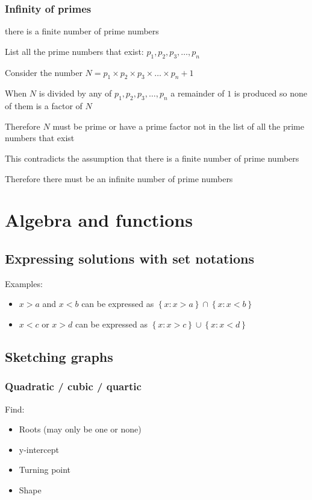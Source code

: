 \documentclass[A4paper]{article}
\begin{document}
	\subsubsection{Infinity of primes}
	\begin{description}
		\item [ Assumption:] there is a finite number of prime numbers
		\item List all the prime numbers that exist: $p_1, p_2, p_3, \dots, p_n$
		\item Consider the number $N = p_1 \times p_2 \times p_3 \times \dots \times p_n + 1$
		\item When $N$ is divided by any of $p_1, p_2, p_3, \dots, p_n$ a remainder of $1$ is produced so none of them is a factor of $N$
		\item Therefore $N$ must be prime or have a prime factor not in the list of all the prime numbers that exist
		\item This contradicts the assumption that there is a finite number of prime numbers
		\item Therefore there must be an infinite number of prime numbers
	\end{description}


	\pagebreak

	\section{Algebra and functions}
	\subsection{Expressing solutions with set notations}
	Examples:
	\begin{itemize}
		\item $x>a$ and $x<b$ can be expressed as $\left\lbrace x : x>a \right\rbrace \cap \left\lbrace x:x<b\right\rbrace$
		\item $x<c$ or $x>d$ can be expressed as $\left\lbrace x : x>c \right\rbrace \cup \left\lbrace x:x<d\right\rbrace$
	\end{itemize}

	\subsection{Sketching graphs}
	\subsubsection{Quadratic / cubic / quartic}
	Find:
	\begin{itemize}
		\item Roots (may only be one or none)
		\item y-intercept
		\item Turning point
		\item Shape
	\end{itemize}
\end{document}

